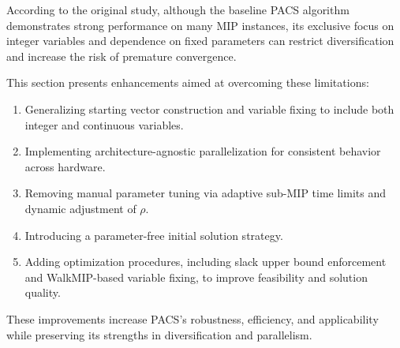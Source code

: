 According to the original study, although the baseline PACS algorithm demonstrates strong performance on many MIP instances, its exclusive focus on integer variables and dependence on fixed parameters can restrict diversification and increase the risk of premature convergence.

This section presents enhancements aimed at overcoming these limitations:
\begin{enumerate}
\item Generalizing starting vector construction and variable fixing to include both integer and continuous variables.
\item Implementing architecture-agnostic parallelization for consistent behavior across hardware.
\item Removing manual parameter tuning via adaptive sub-MIP time limits and dynamic adjustment of $\rho$.
\item Introducing a parameter-free initial solution strategy.
\item Adding optimization procedures, including slack upper bound enforcement and WalkMIP-based variable fixing, to improve feasibility and solution quality.
\end{enumerate}

These improvements increase PACS’s robustness, efficiency, and applicability while preserving its strengths in diversification and parallelism.

